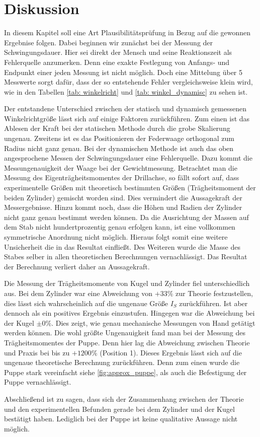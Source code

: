 \section{Diskussion}
In diesem Kapitel soll eine Art Plausibilitätsprüfung in Bezug auf die
gewonnen Ergebnise folgen.
Dabei beginnen wir zunächst bei der Messung der Schwingungsdauer.
Hier sei direkt der Mensch und seine Reaktionszeit als Fehlerquelle anzumerken.
Denn eine exakte Festlegung von Anfangs- und Endpunkt einer jeden Messung ist
nicht möglich. %
Doch eine Mittelung
über 5 Messwerte sorgt dafür, dass der so entstehende Fehler vergleichsweise klein wird, wie in den Tabellen
\ref{tab: winkelricht} und \ref{tab: winkel_dynamisc} zu sehen ist.

Der entstandene Unterschied zwischen der statisch und dynamisch gemessenen Winkelrichtgröße
lässt sich auf einige Faktoren zurückführen.
Zum einen ist das Ablesen der Kraft bei der statischen Methode
durch die grobe Skalierung ungenau.
Zweitens ist es das Positionieren der Federwaage orthogonal zum Radius
nicht ganz genau.
Bei der dynamischen Methode ist auch das oben angesprochene Messen der Schwingungsdauer
eine Fehlerquelle.
Dazu kommt die Messungenauigkeit der Waage bei der Gewichtmessung.
Betrachtet man die Messung des Eigenträgheitsmomentes der Drillachse, so fällt sofort auf,
dass experimentelle Größen mit theoretisch bestimmten Größen (Trägheitsmoment der beiden Zylinder)
gemischt worden sind.
Dies vermindert die Aussagekraft der Messergebnisse.
Hinzu kommt noch, dass die Höhen und Radien der Zylinder nicht ganz genau bestimmt werden können.
Da die Ausrichtung der Massen auf dem Stab nicht hundertprozentig genau erfolgen kann, ist
eine vollkommen symmetrische Anordnung nicht möglich.
Hieraus folgt somit eine weitere Unsicherheit die in das Resultat einfließt.
Des Weiteren wurde die Masse des Stabes selber in allen theoretischen Berechnungen vernachlässigt.
Das Resultat der Berechnung verliert daher an Aussagekraft.

Die Messung der Trägheitsmomente von Kugel und Zylinder fiel unterschiedlich aus.
Bei dem Zylinder war eine Abweichung von $+33\%$ zur Theorie festzustellen,
dies lässt sich wahrscheinlich auf die ungenaue Größe $I_S$ zurückführen.
Ist aber dennoch als ein positives Ergebnis einzustufen.
Hingegen war die Abweichung bei der Kugel $\pm 0\%$. Dies zeigt,
wie genau mechanische Messungen von Hand getätigt werden können.
Die wohl größte Ungenauigkeit fand man bei der Messung des Trägheitsmomentes der Puppe.
Denn hier lag die Abweichung zwischen Theorie und Praxis bei bis zu
$+1200\%$ (Position 1). Dieses Ergebnis lässt sich auf die
ungenaue theoretische Berechnung zurückführen.
Denn zum einen wurde die Puppe stark vereinfacht siehe \ref{fig:approx_puppe}, als auch
die Befestigung der Puppe vernachlässigt.  %

Abschließend ist zu sagen, dass sich der Zusammenhang zwischen der Theorie und den experimentellen Befunden
gerade bei dem Zylinder und der Kugel bestätigt haben.
Lediglich bei der Puppe ist keine qualitative Aussage nicht möglich.
